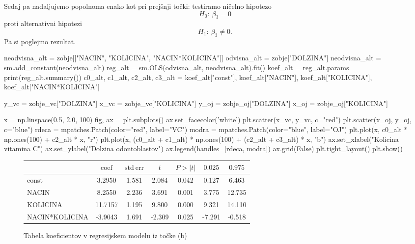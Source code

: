 \documentclass[10pt, a4paper]{article}
\begin{document}
Sedaj pa nadaljujemo popolnoma enako kot pri prejšnji točki:
testiramo ničelno hipotezo 
$$H_0:\ \beta_3 = 0$$
proti alternativni hipotezi 
$$H_1:\ \beta_3 \neq 0.$$
Pa si poglejmo rezultat.

\begin{python}
    neodvisna_alt = zobje[["NACIN", "KOLICINA", "NACIN*KOLICINA"]]
    odvisna_alt = zobje["DOLZINA"]
    neodvisna_alt = sm.add_constant(neodvisna_alt)
    reg_alt = sm.OLS(odvisna_alt, neodvisna_alt).fit()
    koef_alt = reg_alt.params
    print(reg_alt.summary())
    c0_alt, c1_alt, c2_alt, c3_alt = koef_alt["const"], koef_alt["NACIN"], koef_alt["KOLICINA"], koef_alt["NACIN*KOLICINA"]

    y_vc = zobje_vc["DOLZINA"]
    x_vc = zobje_vc["KOLICINA"]
    y_oj = zobje_oj["DOLZINA"]
    x_oj = zobje_oj["KOLICINA"]

    x = np.linspace(0.5, 2.0, 100)
    fig, ax = plt.subplots()
    ax.set_facecolor('white')
    plt.scatter(x_vc, y_vc, c="red")
    plt.scatter(x_oj, y_oj, c="blue")
    rdeca = mpatches.Patch(color="red", label="VC")
    modra = mpatches.Patch(color="blue", label="OJ")
    plt.plot(x, c0_alt * np.ones(100) + c2_alt * x, "r")
    plt.plot(x, (c0_alt + c1_alt) * np.ones(100) + (c2_alt + c3_alt) * x, "b")
    ax.set_xlabel("Kolicina vitamina C")
    ax.set_ylabel("Dolzina odontoblastov")
    ax.legend(handles=[rdeca, modra])
    ax.grid(False)
    plt.tight_layout()
    plt.show()
\end{python}

\begin{figure}[H]
    \begin{center}
        \begin{tabular}{lSSSSSS} \toprule
            & $\mathrm{coef}$ & $\mathrm{std\ err}$ & {$t$} & {$P > |t|$} & {$0.025$} & {$0.975$} \\ \midrule
            const            &  3.2950   &   1.581   &   2.084   &   0.042    &   0.127   &    6.463\\
            NACIN            &  8.2550   &   2.236   &   3.691   &   0.001    &   3.775   &   12.735\\
            KOLICINA         & 11.7157   &   1.195   &   9.800   &   0.000    &   9.321   &   14.110\\
            NACIN*KOLICINA   & -3.9043   &   1.691   &  -2.309   &   0.025    &  -7.291   &   -0.518\\
            \bottomrule
        \end{tabular}   
    \end{center}
    \caption{Tabela koeficientov v regresijskem modelu iz točke (b)} 
\end{figure}
\end{document}
